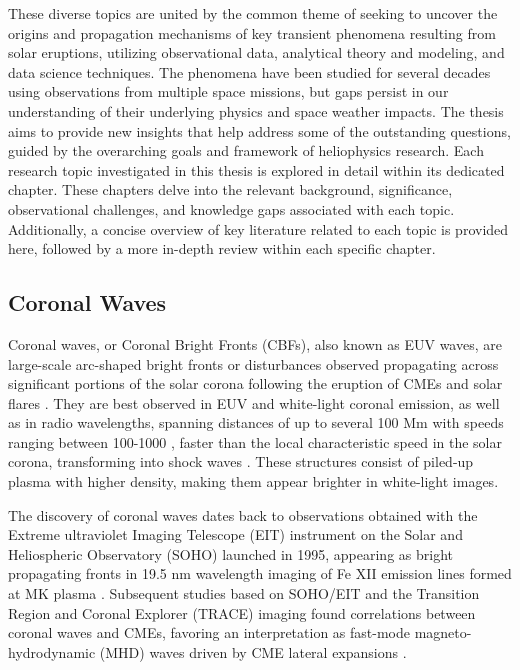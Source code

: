 These diverse topics are united by the common theme of seeking to uncover the origins and propagation mechanisms of key transient phenomena resulting from solar eruptions, utilizing observational data, analytical theory and modeling, and data science techniques. The phenomena have been studied for several decades using observations from multiple space missions, but gaps persist in our understanding of their underlying physics and space weather impacts. The thesis aims to provide new insights that help address some of the outstanding questions, guided by the overarching goals and framework of heliophysics research. Each research topic investigated in this thesis is explored in detail within its dedicated chapter. These chapters delve into the relevant background, significance, observational challenges, and knowledge gaps associated with each topic. Additionally, a concise overview of key literature related to each topic is provided here, followed by a more in-depth review within each specific chapter.


\subsection{Coronal Waves}
Coronal waves, or Coronal Bright Fronts (CBFs), also known as EUV waves, are large-scale arc-shaped bright fronts or disturbances observed propagating across significant portions of the solar corona following the eruption of CMEs and solar flares \citep{thompson_1998, nindos_2008, vrsnak_2008, magdalenic_2010, veronig_2010, warmuth_2015}. They are best observed in EUV and white-light coronal emission, as well as in radio wavelengths, spanning distances of up to several 100 Mm with speeds ranging between 100-1000 \kms, faster than the local characteristic speed in the solar corona, transforming into shock waves \citep{pick_2006, thompson_2009, nitta_2013, liu_2014}. These structures consist of piled-up plasma with higher density, making them appear brighter in white-light images.

The discovery of coronal waves dates back to observations obtained with the Extreme ultraviolet Imaging Telescope (EIT) instrument on the Solar and Heliospheric Observatory (SOHO) launched in 1995, appearing as bright propagating fronts in 19.5 nm wavelength imaging of Fe XII emission lines formed at  MK plasma \citep{thompson_1998}. Subsequent studies based on SOHO/EIT and the Transition Region and Coronal Explorer (TRACE) imaging found correlations between coronal waves and CMEs, favoring an interpretation as fast-mode magneto-hydrodynamic (MHD) waves driven by CME lateral expansions \citep{biesecker_2002}.

